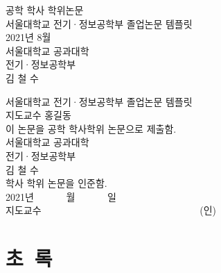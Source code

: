\documentclass[10pt,a4paper]{report}
\def\papertitle{서울대학교 전기·정보공학부 졸업논문 템플릿} %
\def\paperdate{2021년 8월} %
\def\paperauthor{김철수} %
\def\paperauthorspaced{김 철 수}
\def\paperadvisor{홍길동} %
\begin{document}
\renewcommand{\abstractname}{초~록}
\renewcommand{\contentsname}{목~차}
\renewcommand{\listtablename}{표~목차}
\renewcommand{\listfigurename}{그림~목차}

\thispagestyle{empty} %
\begin{center}
    \fontsize{16pt}{19pt}\selectfont
    공학 학사 학위논문 \\
    \vspace{2cm}
    \fontsize{21pt}{25pt}\selectfont
    \papertitle \\
    \vfill
    \fontsize{16pt}{19pt}\selectfont
    \paperdate \\
    \vspace{4cm}
    서울대학교 공과대학 \\
    \vspace{1cm}
    전기·정보공학부 \\
    \vspace{1cm}
    \paperauthorspaced
\end{center}
\newpage

\thispagestyle{empty} %
\begin{center}
    \fontsize{21pt}{25pt}\selectfont
    \papertitle \\
    \vspace{1cm}
    \fontsize{16pt}{19pt}\selectfont
    지도교수 \paperadvisor \\
    \vspace{1cm}
    이 논문을 공학 학사학위 논문으로 제출함. \\
    \vfill
    서울대학교 공과대학 \\
    \vspace{1cm}
    전기·정보공학부 \\
    \paperauthorspaced \\
    \vspace{1cm}
     학사 학위 논문을 인준함. \\
    \vspace{1cm}
    2021년 ~~~~~~월 ~~~~~~일 \\
    \vspace{1cm}
    지도교수 ~~~~~~~~~~~~~~~~~~~~~~~~~~~~~~~~(인)
\end{center}
\newpage

\chapter*{\abstractname} %
\end{document}
